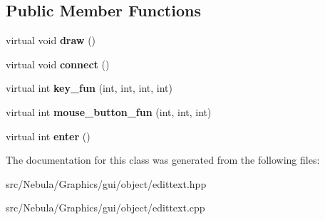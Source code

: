 \subsection*{\-Public \-Member \-Functions}
\begin{DoxyCompactItemize}
\item 
\hypertarget{classglutpp_1_1gui_1_1object_1_1edittext_a6667510174711dd4718f8f8b07b89a6e}{virtual void {\bfseries draw} ()}\label{classglutpp_1_1gui_1_1object_1_1edittext_a6667510174711dd4718f8f8b07b89a6e}

\item 
\hypertarget{classglutpp_1_1gui_1_1object_1_1edittext_aacbbfc6f239db6356d83de334f6b0bdc}{virtual void {\bfseries connect} ()}\label{classglutpp_1_1gui_1_1object_1_1edittext_aacbbfc6f239db6356d83de334f6b0bdc}

\item 
\hypertarget{classglutpp_1_1gui_1_1object_1_1edittext_a88d4a62bd971978e1b60711859b4390d}{virtual int {\bfseries key\-\_\-fun} (int, int, int, int)}\label{classglutpp_1_1gui_1_1object_1_1edittext_a88d4a62bd971978e1b60711859b4390d}

\item 
\hypertarget{classglutpp_1_1gui_1_1object_1_1edittext_ae7decbc3c95b939cd78d782c48702bec}{virtual int {\bfseries mouse\-\_\-button\-\_\-fun} (int, int, int)}\label{classglutpp_1_1gui_1_1object_1_1edittext_ae7decbc3c95b939cd78d782c48702bec}

\item 
\hypertarget{classglutpp_1_1gui_1_1object_1_1edittext_a654792733884b42cba054e6a84894876}{virtual int {\bfseries enter} ()}\label{classglutpp_1_1gui_1_1object_1_1edittext_a654792733884b42cba054e6a84894876}

\end{DoxyCompactItemize}


\-The documentation for this class was generated from the following files\-:\begin{DoxyCompactItemize}
\item 
src/\-Nebula/\-Graphics/gui/object/edittext.\-hpp\item 
src/\-Nebula/\-Graphics/gui/object/edittext.\-cpp\end{DoxyCompactItemize}
